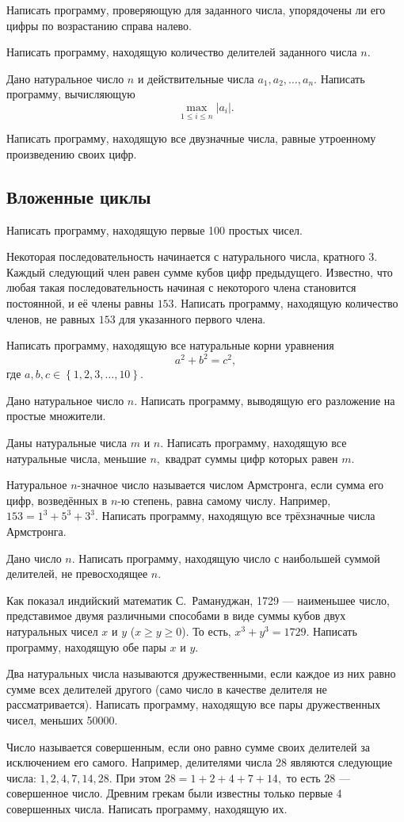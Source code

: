 \task Написать программу, проверяющую для заданного числа, упорядочены
ли его цифры по возрастанию справа налево.

\task Написать программу, находящую количество делителей заданного
числа $n$.

\task Дано натуральное число $n$ и действительные числа $a_1, a_2,
\ldots, a_n$. Написать программу, вычисляющую
\[
\max_{1\leqslant i\leqslant n} \left|a_i\right|.
\]

\task Написать программу, находящую все двузначные числа, равные
утроенному произведению своих цифр.


\subsection{Вложенные циклы}

\task Написать программу, находящую первые 100 простых чисел.

\task Некоторая последовательность начинается с натурального числа,
кратного 3. Каждый следующий член равен сумме кубов цифр
предыдущего. Известно, что любая такая последовательность начиная с
некоторого члена становится постоянной, и её члены равны
$153$. Написать программу, находящую количество членов, не равных $153$
для указанного первого члена.

\task Написать программу, находящую все натуральные корни уравнения
\[
a^2+b^2=c^2,
\]
где $a, b, c \in \left\{1, 2, 3, \ldots, 10\right\}.$

\task Дано натуральное число $n$. Написать программу, выводящую его
разложение на простые множители.

\task Даны натуральные числа $m$ и $n$. Написать программу, находящую
все натуральные числа, меньшие $n,$ квадрат суммы цифр которых равен
$m$.

\task Натуральное $n$-значное число называется числом
Армстронга, если сумма его цифр, возведённых в
$n$-ю степень, равна самому числу. Например, $153 = 1^3 + 5^3 +
3^3$. Написать программу, находящую все трёхзначные числа Армстронга.

\task Дано число $n$. Написать программу, находящую число с наибольшей
суммой делителей, не превосходящее $n$.

\task Как показал индийский математик С.~Рамануджан, 1729 — наименьшее
число, представимое двумя различными
способами в виде суммы кубов двух натуральных чисел $x$ и $y$
($x\geqslant y\geqslant 0$).  То есть, $x^3+y^3=1729$. Написать
программу, находящую обе пары $x$ и $y$.

\task Два натуральных числа называются
дружественными, если каждое из них равно
сумме всех делителей другого (само число в качестве делителя не
рассматривается). Написать программу, находящую все пары дружественных
чисел, меньших 50000.

\task Число называется совершенным, если оно
равно сумме своих делителей за исключением его самого. Например,
делителями числа 28 являются следующие числа: $1, 2, 4, 7, 14, 28.$
При этом $28 = 1+2+4+7+14,$ то есть $28$ — совершенное число. Древним
грекам были известны только первые 4 совершенных числа. Написать
программу, находящую их.
